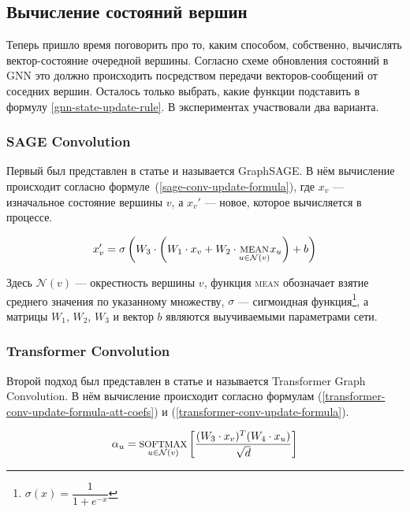 \subsection{Вычисление состояний вершин}

Теперь пришло время поговорить про то, каким способом, собственно, вычислять вектор-состояние очередной вершины. Согласно схеме обновления состояний в GNN это должно происходить посредством передачи векторов-сообщений от соседних вершин. Осталось только выбрать, какие функции подставить в формулу \ref{gnn-state-update-rule}. В экспериментах участвовали два варианта.

\subsubsection{SAGE Convolution}

Первый был представлен в статье \cite{sage-conv-paper} и называется GraphSAGE. В нём вычисление происходит согласно формуле~(\ref{sage-conv-update-formula}), где $x_v$ --- изначальное состояние вершины $v$, а $x_v'$ --- новое, которое вычисляется в процессе.

\begin{equation} \label{sage-conv-update-formula}
    x_v' = \sigma \left(W_3 \cdot \left(W_1 \cdot x_v + W_2 \cdot \underset{u \in \mathcal{N}(v)}{\text{\textsc{mean}}} x_u \right) + b \right)
\end{equation}

Здесь $\mathcal{N}(v)$ --- окрестность вершины $v$, функция \textsc{mean} обозначает взятие среднего значения по указанному множеству, $\sigma$ --- сигмоидная функция\footnote{$\sigma(x) = \dfrac{1}{1 + e^{-x}}$}, а матрицы $W_1$, $W_2$, $W_3$ и вектор $b$ являются выучиваемыми параметрами сети.

\subsubsection{Transformer Convolution}

Второй подход был представлен в статье \cite{transformer-conv-paper} и называется Transformer Graph Convolution. В нём вычисление происходит согласно формулам (\ref{transformer-conv-update-formula-att-coefs}) и (\ref{transformer-conv-update-formula}).

\begin{equation} \label{transformer-conv-update-formula-att-coefs}
    \alpha_{u} = \underset{u \in \mathcal{N}(v)}{\text{\textsc{softmax}}} \left[\frac{(W_3 \cdot x_v)^T (W_4 \cdot x_u)}{\sqrt d} \right]
\end{equation}

